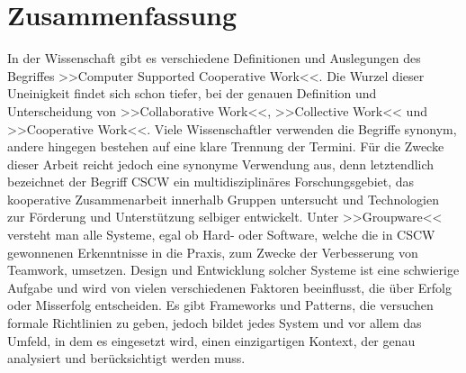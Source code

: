 \section*{Zusammenfassung}
In der Wissenschaft gibt es verschiedene Definitionen und Auslegungen des Begriffes >>Computer Supported Cooperative Work<<. Die Wurzel dieser Uneinigkeit findet sich schon tiefer, bei der genauen Definition und Unterscheidung von >>Collaborative Work<<, >>Collective Work<< und >>Cooperative Work<<. Viele Wissenschaftler verwenden die Begriffe synonym, andere hingegen bestehen auf eine klare Trennung der Termini. Für die Zwecke dieser Arbeit reicht jedoch eine synonyme Verwendung aus, denn letztendlich bezeichnet der Begriff \ac{CSCW} ein multidisziplinäres Forschungsgebiet, das kooperative Zusammenarbeit innerhalb Gruppen untersucht und Technologien zur Förderung und Unterstützung selbiger entwickelt. Unter >>Groupware<< versteht man alle Systeme, egal ob Hard- oder Software, welche die in \ac{CSCW} gewonnenen Erkenntnisse in die Praxis, zum Zwecke der Verbesserung von Teamwork, umsetzen. Design und Entwicklung solcher Systeme ist eine schwierige Aufgabe und wird von vielen verschiedenen Faktoren beeinflusst, die über Erfolg oder Misserfolg entscheiden. Es gibt Frameworks und Patterns, die versuchen formale Richtlinien zu geben, jedoch bildet jedes System und vor allem das Umfeld, in dem es eingesetzt wird, einen einzigartigen Kontext, der genau analysiert und berücksichtigt werden muss.

